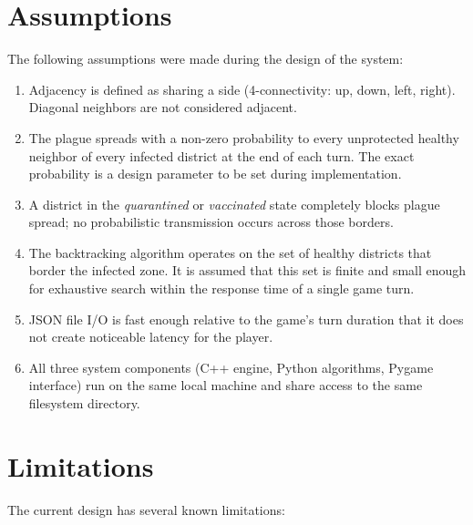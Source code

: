 \documentclass[12pt, a4paper]{article}
\begin{document}
\section{Assumptions}

The following assumptions were made during the design of the system:

\begin{enumerate}
  \item Adjacency is defined as sharing a side (4-connectivity: up, down,
        left, right). Diagonal neighbors are not considered adjacent.
  \item The plague spreads with a non-zero probability to every unprotected
        healthy neighbor of every infected district at the end of each turn.
        The exact probability is a design parameter to be set during
        implementation.
  \item A district in the \emph{quarantined} or \emph{vaccinated} state
        completely blocks plague spread; no probabilistic transmission occurs
        across those borders.
  \item The backtracking algorithm operates on the set of healthy districts
        that border the infected zone. It is assumed that this set is finite
        and small enough for exhaustive search within the response time of
        a single game turn.
  \item JSON file I/O is fast enough relative to the game's turn duration
        that it does not create noticeable latency for the player.
  \item All three system components (C++ engine, Python algorithms, Pygame
        interface) run on the same local machine and share access to the
        same filesystem directory.
\end{enumerate}

\section{Limitations}

The current design has several known limitations:
\end{document}
